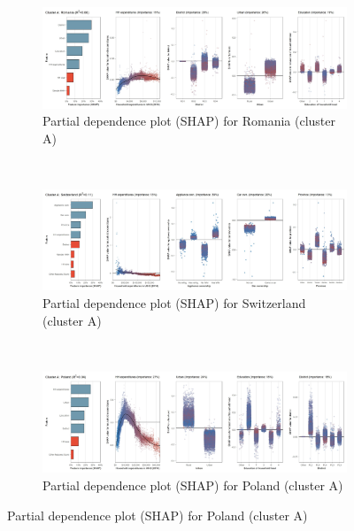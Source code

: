 \begin{figure}[ht!]\ContinuedFloat
    \centering
   \begin{subfigure}[b]{\textwidth}
         \centering
         \caption{Partial dependence plot (SHAP) for Romania (cluster A)}
         \label{fig:5b_ROU}
         \includegraphics[width=\textwidth]{Figure 5b/Figure_5b_ROU}         
     \end{subfigure}
    \\
    \vspace{0.5cm}
   \begin{subfigure}[b]{\textwidth}
         \centering
         \caption{Partial dependence plot (SHAP) for Switzerland (cluster A)}
         \label{fig:5b_CHE}
         \includegraphics[width=\textwidth]{Figure 5b/Figure_5b_CHE}         
     \end{subfigure}
    \\
    \vspace{0.5cm}
   \begin{subfigure}[b]{\textwidth}
         \centering
         \caption{Partial dependence plot (SHAP) for Poland (cluster A)}
         \label{fig:5b_POL}
         \includegraphics[width=\textwidth]{Figure 5b/Figure_5b_POL}

\end{subfigure}
\end{figure}

